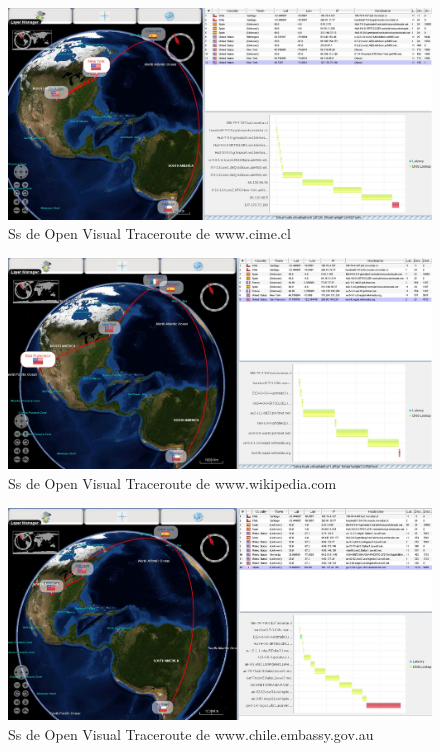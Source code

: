 \documentclass[a4paper]{article}
\begin{document}
\begin{figure}
\centering
\includegraphics[width=1\textwidth]{cime.JPG}
\caption{\label{fig:cime}Ss de Open Visual Traceroute de www.cime.cl}
\end{figure}

\begin{figure}
\centering
\includegraphics[width=1\textwidth]{wikipedia.JPG}
\caption{\label{fig:wiki}Ss de Open Visual Traceroute de www.wikipedia.com}
\end{figure}

\begin{figure}
\centering
\includegraphics[width=1\textwidth]{chileembassy1.JPG}
\caption{\label{fig:embassy}Ss de Open Visual Traceroute de www.chile.embassy.gov.au}
\end{figure}
\end{document}
